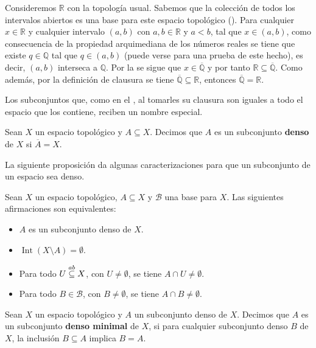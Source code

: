 \begin{Ejm}\label{Ejm:ejemplo_denso}
   Consideremos $\mathbb{R}$ con la topología usual. Sabemos que la colección de todos los intervalos abiertos es una base para este espacio topológico (). Para cualquier $x\in\mathbb{R}$ y cualquier intervalo $(a,b)$ con $a,b\in\mathbb{R}$ y $a<b$, tal que $x\in(a,b)$, como consecuencia de la propiedad arquimediana de los números reales se tiene que existe $q\in\mathbb{Q}$ tal que $q\in(a,b)$ (puede verse \cite{apostol1974} para una prueba de este hecho), es decir, $(a,b)$ interseca a $\mathbb{Q}$. Por la  se sigue que $x\in\overline{\mathbb{Q}}$ y por tanto $\mathbb{R}\subseteq\overline{\mathbb{Q}}$. Como además, por la definición de clausura se tiene $\overline{\mathbb{Q}}\subseteq\mathbb{R}$, entonces $\overline{\mathbb{Q}}=\mathbb{R}$.
\end{Ejm}
Los subconjuntos que, como en el , al tomarles su clausura son iguales a todo el espacio que los contiene, reciben un nombre especial.
\begin{Def}
   Sean $X$ un espacio topológico y $A\subseteq X$. Decimos que $A$ es un subconjunto \textbf{denso} de $X$ si $\overline{A}=X$. 
\end{Def}
La siguiente proposición da algunas caracterizaciones para que un subconjunto de un espacio sea denso.
\begin{Prop}\label{Prop:Caracterizacion_denso}
   Sean $X$ un espacio topológico, $A\subseteq X$ y $\mathcal{B}$ una base para $X$. Las siguientes afirmaciones son equivalentes:
   \begin{itemize}
      \item[1.] $A$ es un subconjunto denso de $X$.
      \item[2.] $\operatorname{Int}(X\setminus A)=\emptyset$. 
      \item[3.] Para todo $U\stackrel{ab}{\subseteq} X$, con $U\ne\emptyset$, se tiene $A\cap U\ne\emptyset$.
      \item[4.] Para todo $B\in \mathcal{B}$, con $B\ne \emptyset$, se tiene $A\cap B\ne \emptyset$.
   \end{itemize}
\end{Prop}
\begin{Def}\label{Def:denso_minimal}
   Sean $X$ un espacio topológico y $A$ un subconjunto denso de $X$. Decimos que $A$ es un subconjunto \textbf{denso minimal} de $X$, si para cualquier subconjunto denso $B$ de $X$, la inclusión $B\subseteq A$ implica $B=A$.   
\end{Def}
